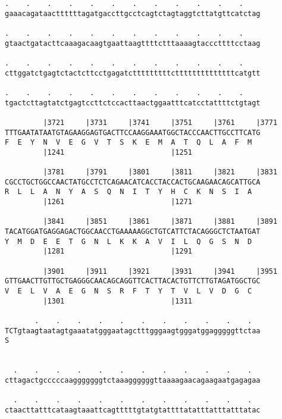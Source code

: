\documentclass{article}
\begin{document}
\begin{Verbatim}
.    .    .    .    .    .    .    .    .    .    .    .    
gaaacagataacttttttagatgaccttgcctcagtctagtaggtcttatgttcatctag
                                                            
.    .    .    .    .    .    .    .    .    .    .    .    
gtaactgatacttcaaagacaagtgaattaagttttctttaaaagtacccttttcctaag
                                                            
.    .    .    .    .    .    .    .    .    .    .    .    
cttggatctgagtctactcttcctgagatctttttttttcttttttttttttttcatgtt
                                                            
.    .    .    .    .    .    .    .    .    .    .    .    
tgactcttagtatctgagtccttctccacttaactggaatttcatcctattttctgtagt
                                                            
         |3721     |3731     |3741     |3751     |3761     |3771
TTTGAATATAATGTAGAAGGAGTGACTTCCAAGGAAATGGCTACCCAACTTGCCTTCATG
F  E  Y  N  V  E  G  V  T  S  K  E  M  A  T  Q  L  A  F  M  
         |1241                         |1251                
  
         |3781     |3791     |3801     |3811     |3821     |3831
CGCCTGCTGGCCAACTATGCCTCTCAGAACATCACCTACCACTGCAAGAACAGCATTGCA
R  L  L  A  N  Y  A  S  Q  N  I  T  Y  H  C  K  N  S  I  A  
         |1261                         |1271                
  
         |3841     |3851     |3861     |3871     |3881     |3891
TACATGGATGAGGAGACTGGCAACCTGAAAAAGGCTGTCATTCTACAGGGCTCTAATGAT
Y  M  D  E  E  T  G  N  L  K  K  A  V  I  L  Q  G  S  N  D  
         |1281                         |1291                
  
         |3901     |3911     |3921     |3931     |3941     |3951
GTTGAACTTGTTGCTGAGGGCAACAGCAGGTTCACTTACACTGTTCTTGTAGATGGCTGC
V  E  L  V  A  E  G  N  S  R  F  T  Y  T  V  L  V  D  G  C  
         |1301                         |1311                
  
       .    .    .    .    .    .    .    .    .    .    .  
TCTgtaagtaatagtgaaatatgggaatagctttgggaagtgggatggagggggttctaa
S                                                           
                                                            
  
  .    .    .    .    .    .    .    .    .    .    .    .  
cttagactgcccccaagggggggtctaaaggggggttaaaagaacagaagaatgagagaa
                                                            
  .    .    .    .    .    .    .    .    .    .    .    .  
ctaacttatttcataagtaaattcagtttttgtatgtattttatatttatttatttatac
                                                            

\end{Verbatim}
\end{document}
